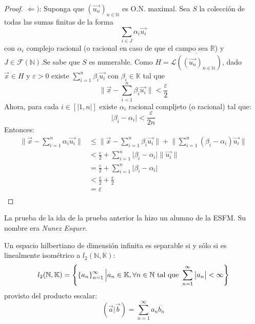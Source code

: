 \documentclass[12pt]{report}
\theoremstyle{largebreak}
\newcommand\abs[1]{\ensuremath{\big|#1\big|}}
\newcommand\norm[1]{\ensuremath{\|#1\|}}
\newcommand\pint[2]{\ensuremath{\left(#1\big| #2\right)}}
\newcommand\conj[1]{\ensuremath{\overline{#1}}}
\begin{document}
\begin{proof}
        $\Leftarrow)$: Suponga que $\left(\vec{u_n} \right)_{n\in\mathbb{N} }$ es O.N. maximal. Sea $S$ la colección de todas las sumas finitas de la forma 
        \begin{equation*}
            \sum_{ i\in J}\alpha_i\vec{u_i}
        \end{equation*}
        con $\alpha_i$ complejo racional (o racional en caso de que el campo sea $\mathbb{R}$) y $J\in\mathcal{F}(\mathbb{N})$.Se sabe que $S$ es numerable. Como $H=\overline{\mathcal{L}(\left(\vec{u_n} \right)_{n\in\mathbb{N} })}$, dado $\vec{x}\in H$ y $\varepsilon>0$ existe $\sum_{ i=1}^{n}\beta_i\vec{u_i}$ con $\beta_i\in\mathbb{K}$ tal que
        \begin{equation*}
            \norm{\vec{x}-\sum_{i=1 }^{n}\beta_i\vec{u_i}}<\frac{\varepsilon}{2}
        \end{equation*}
        Ahora, para cada $i\in\left[|1,n|\right]$ existe $\alpha_i$ racional compljeto (o racional) tal que:
        \begin{equation*}
            \abs{\beta_i-\alpha_i}<\frac{\varepsilon}{2n}
        \end{equation*}
        Entonces:
        \begin{equation*}
            \begin{split}
                \norm{\vec{x}-\sum_{i=1 }^{n}\alpha_i\vec{u_i}}&\leq\norm{\vec{x}-\sum_{i=1 }^{n}\beta_i\vec{u_i}}+\norm{\sum_{ i=1}^{n}(\beta_i-\alpha_i)\vec{u_i}}\\
                &<\frac{\varepsilon}{2}+\sum_{ i=1}^{n}\abs{\beta_i-\alpha_i}\norm{\vec{u_i}}\\
                &=\frac{\varepsilon}{2}+\sum_{ i=1}^{n}\abs{\beta_i-\alpha_i}\\
                &<\frac{\varepsilon}{2}+\frac{\varepsilon}{2} \\
                &=\varepsilon\\
            \end{split}
        \end{equation*}
    \end{proof}

    \begin{obs}
        La prueba de la ida de la prueba anterior la hizo un alumno de la ESFM. Su nombre era \textit{Nunez Esquer}.
    \end{obs}

    \begin{cor}
        Un espacio hilbertiano de dimensión infinita es separable si y sólo si es linealmente isométrico a $l_2(\mathbb{N},\mathbb{K})$:
        \begin{equation*}
            l_2(\mathbb{N},\mathbb{K})=\left\{\left\{a_n \right\}_{n=1 }^\infty\Big|a_n\in\mathbb{K},\forall n\in\mathbb{N}\textup{ tal que }\sum_{ n=1}^{\infty}\abs{a_n}<\infty \right\}
        \end{equation*}
        provisto del producto escalar:
        \begin{equation*}
            \pint{\vec{a}}{\vec{b}}=\sum_{ n=1}^{\infty}a_n\conj{b_n}
        \end{equation*}
    \end{cor}
\end{document}
